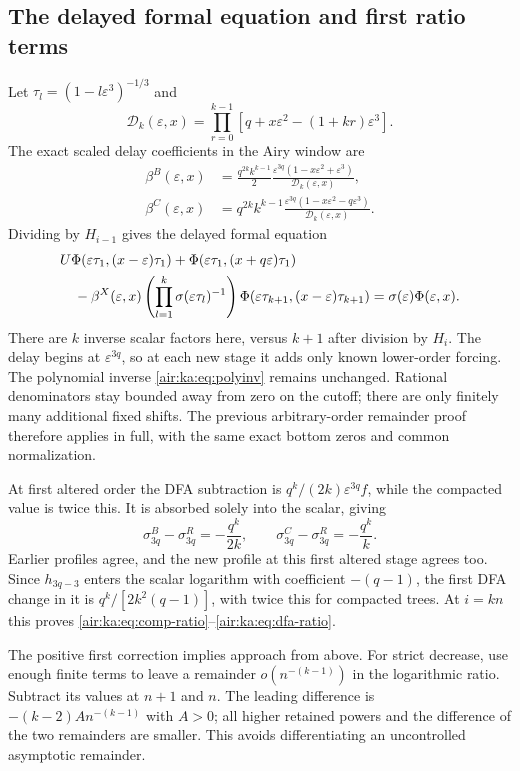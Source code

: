 \documentclass[11pt,letterpaper]{article}
\numberwithin{equation}{section}
\theoremstyle{remark}
\newcommand{\eps}{\varepsilon}
\begin{document}
\subsection{The delayed formal equation and first ratio terms}
Let $\tau_l=(1-l\eps^3)^{-1/3}$ and
\[
 \mathcal D_k(\eps,x)=\prod_{r=0}^{k-1}
 [q+x\eps^2-(1+kr)\eps^3].
\]
The exact scaled delay coefficients in the Airy window are
\begin{align*}
 \beta^B(\eps,x)&=\frac{q^{2k}k^{k-1}}2
 \frac{\eps^{3q}(1-x\eps^2+\eps^3)}{\mathcal D_k(\eps,x)},\\
 \beta^C(\eps,x)&=q^{2k}k^{k-1}
 \frac{\eps^{3q}(1-x\eps^2-q\eps^3)}{\mathcal D_k(\eps,x)}.
\end{align*}
Dividing by $H_{i-1}$ gives the delayed formal equation
\begin{align}\label{air:ka:eq:delayformal}
 &U\Phi(\eps\tau_1,(x-\eps)\tau_1)
 +\Phi(\eps\tau_1,(x+q\eps)\tau_1)\notag\\
 &\quad-\beta^X(\eps,x)
 \left(\prod_{l=1}^k\sigma(\eps\tau_l)^{-1}\right)
 \Phi(\eps\tau_{k+1},(x-\eps)\tau_{k+1})
 =\sigma(\eps)\Phi(\eps,x).
\end{align}
There are $k$ inverse scalar factors here, versus $k+1$ after division by $H_i$. The delay begins at $\eps^{3q}$, so at each new stage it adds only known lower-order forcing. The polynomial inverse \eqref{air:ka:eq:polyinv} remains unchanged. Rational denominators stay bounded away from zero on the cutoff; there are only finitely many additional fixed shifts. The previous arbitrary-order remainder proof therefore applies in full, with the same exact bottom zeros and common normalization.

At first altered order the DFA subtraction is $q^k/(2k)\eps^{3q}f$, while the compacted value is twice this. It is absorbed solely into the scalar, giving
\[
 \sigma_{3q}^B-\sigma_{3q}^R=-\frac{q^k}{2k},\qquad
 \sigma_{3q}^C-\sigma_{3q}^R=-\frac{q^k}{k}.
\]
Earlier profiles agree, and the new profile at this first altered stage agrees too. Since $h_{3q-3}$ enters the scalar logarithm with coefficient $-(q-1)$, the first DFA change in it is $q^k/[2k^2(q-1)]$, with twice this for compacted trees. At $i=kn$ this proves \eqref{air:ka:eq:comp-ratio}--\eqref{air:ka:eq:dfa-ratio}.

The positive first correction implies approach from above. For strict decrease, use enough finite terms to leave a remainder $o(n^{-(k-1)})$ in the logarithmic ratio. Subtract its values at $n+1$ and $n$. The leading difference is $-(k-2)A n^{-(k-1)}$ with $A>0$; all higher retained powers and the difference of the two remainders are smaller. This avoids differentiating an uncontrolled asymptotic remainder.
\end{document}

